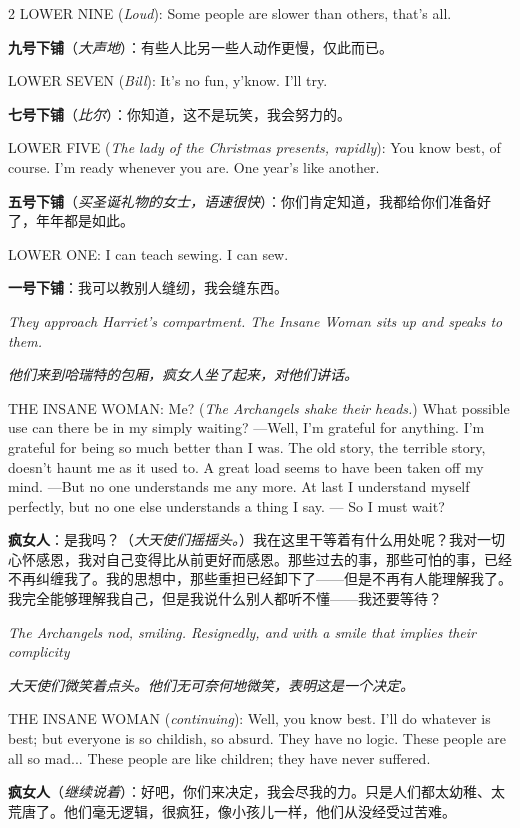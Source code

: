 \documentclass[lang=cn,newtx,10pt,scheme=chinese]{elegantbook}
\newcommand{\pair}[2]{%
\switchcolumn* #2\par
\switchcolumn  #1\par
}
\begin{document}
\begin{paracol}{2}
\pair{
    \textbf{九号下铺}（\textit{大声地}）：有些人比另一些人动作更慢，仅此而已。
}{
    LOWER NINE (\textit{Loud}): Some people are slower than others, that's all.
}

\pair{
    \textbf{七号下铺}（\textit{比尔}）：你知道，这不是玩笑，我会努力的。
}{
    LOWER SEVEN (\textit{Bill}): It's no fun, y'know. I'll try.
}

\pair{
    \textbf{五号下铺}（\textit{买圣诞礼物的女士，语速很快}）：你们肯定知道，我都给你们准备好了，年年都是如此。
}{
    LOWER FIVE (\textit{The lady of the Christmas presents, rapidly}): You know best, of course. I'm ready whenever you are. One year's like another.
}

\pair{
    \textbf{一号下铺}：我可以教别人缝纫，我会缝东西。
}{
    LOWER ONE: I can teach sewing. I can sew.
    \newline
}

\pair{
    \textit{他们来到哈瑞特的包厢，疯女人坐了起来，对他们讲话。}
}{
    \textit{They approach Harriet’s compartment. The Insane Woman sits up and speaks to them.}
    \newline
}

\pair{
    \textbf{疯女人}：是我吗？（\textit{大天使们摇摇头。}）我在这里干等着有什么用处呢？我对一切心怀感恩，我对自己变得比从前更好而感恩。那些过去的事，那些可怕的事，已经不再纠缠我了。我的思想中，那些重担已经卸下了——但是不再有人能理解我了。我完全能够理解我自己，但是我说什么别人都听不懂——我还要等待？
}{
    THE INSANE WOMAN: Me? (\textit{The Archangels shake their heads.}) What possible use can there be in my simply waiting? —Well, I'm grateful for anything. I'm grateful for being so much better than I was. The old story, the terrible story, doesn't haunt me as it used to. A great load seems to have been taken off my mind. —But no one understands me any more. At last I understand myself perfectly, but no one else understands a thing I say. — So I must wait?
    \newline
}

\pair{
    \textit{大天使们微笑着点头。他们无可奈何地微笑，表明这是一个决定。}
}{
    \textit{The Archangels nod, smiling. Resignedly, and with a smile that implies their complicity}
    \newline
}

\pair{
    \textbf{疯女人}（\textit{继续说着}）：好吧，你们来决定，我会尽我的力。只是人们都太幼稚、太荒唐了。他们毫无逻辑，很疯狂，像小孩儿一样，他们从没经受过苦难。
}{
    THE INSANE WOMAN (\textit{continuing}): Well, you know best. I'll do whatever is best; but everyone is so childish, so absurd. They have no logic. These people are all so mad... These people are like children; they have never suffered.
    \newline
}


\end{paracol}
\end{document}
